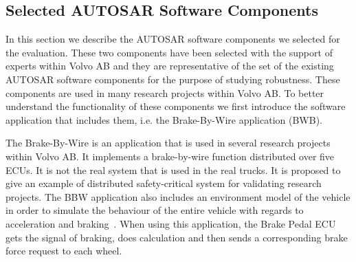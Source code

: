 \subsection{Selected AUTOSAR Software Components}\label{sec:example}
In this section we describe the AUTOSAR software components we selected for the evaluation. These two components have been selected with the support of experts within Volvo AB and they are representative of the set of the existing AUTOSAR software components for the purpose of studying robustness. These components are used in many research projects within Volvo AB. 
%
To better understand the functionality of these components %
we first introduce the software application that includes them, i.e. the Brake-By-Wire application (BWB). %

The Brake-By-Wire is an application that is used in several research projects within Volvo AB. %
It implements a brake-by-wire function distributed over five ECUs. It is not the real system that is used in the real trucks. It is proposed to give an example of distributed safety-critical system for validating research projects. The BBW application also includes an environment model of the vehicle in order to simulate the behaviour of the entire vehicle with regards to acceleration and braking~\cite{pp}. When using this application, the Brake Pedal ECU gets the signal of braking, does calculation and then sends a corresponding brake force request to each wheel.

